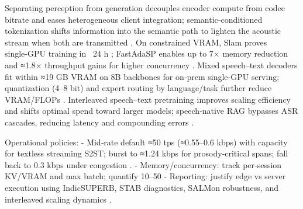 Separating perception from generation decouples encoder compute from codec bitrate and eases heterogeneous client integration; semantic‑conditioned tokenization shifts information into the semantic path to lighten the acoustic stream when both are transmitted \cite{hu2025salmduplexefficientdirectmodelingspeechl,yang2025diffsoundstreamefficientspeechtokenizati}. On constrained VRAM, Slam proves single‑GPU training in ~24 h \cite{maimon2025slammingtrainingspeechlanguagemodelonegp}; FastAdaSP enables up to 7× memory reduction and ≈1.8× throughput gains for higher concurrency \cite{lu2024fastadaspmultitaskadaptedefficientinfere}. Mixed speech–text decoders fit within ≈19 GB VRAM on 8B backbones for on‑prem single‑GPU serving; quantization (4–8 bit) and expert routing by language/task further reduce VRAM/FLOPs \cite{dao2025ichigomixedmodalearlyfusionrealtimevoice,lu2024fastadaspmultitaskadaptedefficientinfere}. Interleaved speech–text pretraining improves scaling efficiency and shifts optimal spend toward larger models; speech‑native RAG bypasses ASR cascades, reducing latency and compounding errors \cite{maimon2025scalinganalysisinterleavedspeechtextlang,min2025speechretrievalaugmentedgenerationwithou,wang2023slmbridgethingapbetweenspeechtextfoundat,maimon2025slammingtrainingspeechlanguagemodelonegp}.

Operational policies:
- Mid‑rate default ≈50 tps (≈0.55–0.6 kbps) with capacity for textless streaming S2ST; burst to ≈1.24 kbps for prosody‑critical spans; fall back to 0.3 kbps under congestion \cite{zhao2024textlessstreamingspeechtranslationsemant,yang2025diffsoundstreamefficientspeechtokenizati,xue2025hhcodechighcompressionfidelitydiscretene}.
- Memory/concurrency: track per‑session KV/VRAM and max batch; quantify 10–50%
- Reporting: justify edge vs server execution using IndicSUPERB, STAB diagnostics, SALMon robustness, and interleaved scaling dynamics \cite{entry2025indicsuperbspeechprocessinguniversalperf,vashishth2024stabspeechtokenizerassessmentbenchmark,maimon2025salmonsuiteacousticlanguagemodelevaluati,maimon2025scalinganalysisinterleavedspeechtextlang}.

